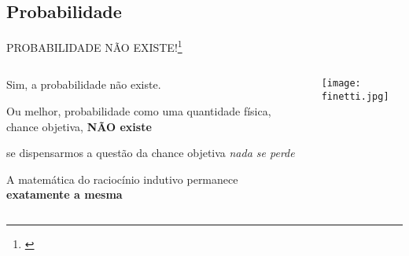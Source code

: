 

\subsection{Probabilidade}
\begin{frame}{PROBABILIDADE NÃO EXISTE!\footnote{\textcite{definettiTheoryProbability1974}}}
    \begin{columns}
        \begin{column}{0.8\textwidth}
        \begin{vfilleditems}
            \item Sim, a probabilidade não existe.
            \item Ou melhor, probabilidade como uma quantidade física,
                  chance objetiva, \textbf{NÃO existe}
            \item se dispensarmos a questão da chance objetiva \textit{nada se perde}
            \item A matemática do raciocínio indutivo permanece
                  \textbf{exatamente a mesma}
        \end{vfilleditems}
        \end{column}
        \begin{column}{0.2\textwidth}
        \centering
        \texttt{[image: finetti.jpg]}
        \end{column}
    \end{columns}
\end{frame}

